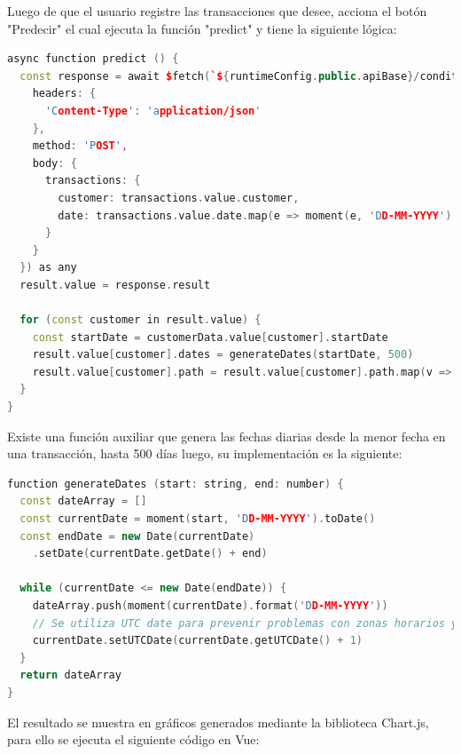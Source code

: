 Luego de que el usuario registre las transacciones que desee, acciona el botón "Predecir" el cual ejecuta la función "predict" y tiene la siguiente lógica:

\begin{lstlisting}[language=C++, caption=predict en index.vue]
async function predict () {
  const response = await $fetch(`${runtimeConfig.public.apiBase}/conditional-probability-alive`, {
    headers: {
      'Content-Type': 'application/json'
    },
    method: 'POST',
    body: {
      transactions: {
        customer: transactions.value.customer,
        date: transactions.value.date.map(e => moment(e, 'DD-MM-YYYY').format('MM/DD/YYYY'))
      }
    }
  }) as any
  result.value = response.result

  for (const customer in result.value) {
    const startDate = customerData.value[customer].startDate
    result.value[customer].dates = generateDates(startDate, 500)
    result.value[customer].path = result.value[customer].path.map(v => Math.floor((1 - v) * 1000) / 10)
  }
}
\end{lstlisting}	

Existe una función auxiliar que genera las fechas diarias desde la menor fecha en una transacción, hasta 500 días luego, su implementación es la siguiente:

\begin{lstlisting}[language=C++, caption=generateDates en index.vue]
function generateDates (start: string, end: number) {
  const dateArray = []
  const currentDate = moment(start, 'DD-MM-YYYY').toDate()
  const endDate = new Date(currentDate)
  	.setDate(currentDate.getDate() + end)

  while (currentDate <= new Date(endDate)) {
    dateArray.push(moment(currentDate).format('DD-MM-YYYY'))
    // Se utiliza UTC date para prevenir problemas con zonas horarios y DST
    currentDate.setUTCDate(currentDate.getUTCDate() + 1)
  }
  return dateArray
}
\end{lstlisting}	

El resultado se muestra en gráficos generados mediante la biblioteca Chart.js, para ello se ejecuta el siguiente código en Vue:


